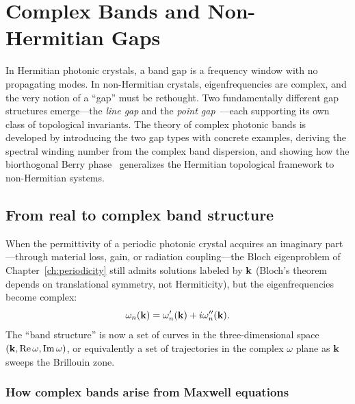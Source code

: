 \chapter{Complex Bands and Non-Hermitian Gaps}
\label{ch:complex-bands}

\begin{chapterlead}
In Hermitian photonic crystals, a band gap is a frequency window with no
propagating modes. In non-Hermitian crystals, eigenfrequencies are
complex, and the very notion of a ``gap'' must be rethought. Two
fundamentally different gap structures emerge---the \emph{line gap} and
the \emph{point gap}~\cite{kawabata2018symmetry,kawabata2019classification,ryu2010topological}---each supporting its own class of topological
invariants. The theory of complex photonic bands is developed by
introducing the two gap types with concrete examples, deriving the spectral
winding number from the complex band dispersion, and showing how the
biorthogonal Berry phase~\cite{yao2018edge,yokomizo2019non,kunst2018biorthogonal,icon2021exceptional,shen2017topological,gong2018topological} generalizes the Hermitian topological framework
to non-Hermitian systems.
\end{chapterlead}


\section{From real to complex band structure}
\label{sec:complex-bands-intro}

When the permittivity of a periodic photonic crystal acquires an imaginary
part---through material loss, gain, or radiation coupling---the Bloch
eigenproblem of Chapter~\ref{ch:periodicity} still admits solutions
labeled by $\mathbf{k}$ (Bloch's theorem depends on translational symmetry, not
Hermiticity), but the eigenfrequencies become complex:
\begin{equation}
 \omega_n(\mathbf{k}) = \omega_n'(\mathbf{k}) + i\omega_n''(\mathbf{k}).
 \label{eq:complex-band}
\end{equation}
The ``band structure'' is now a set of curves in the three-dimensional
space $(\mathbf{k}, \operatorname{Re}\omega, \operatorname{Im}\omega)$, or equivalently a set of trajectories
in the complex $\omega$ plane as $\mathbf{k}$ sweeps the Brillouin zone.

\subsection{How complex bands arise from Maxwell equations}
\label{ssec:complex-bands-maxwell}

